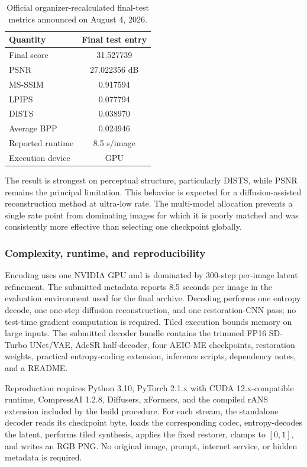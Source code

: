 \documentclass[10pt,twocolumn,letterpaper]{article}
\begin{document}
\begin{table}[h]
\centering\small
\begin{tabular}{@{}lc@{}}
\toprule
Quantity & Final test entry \\
\midrule
Final score & 31.527739 \\
PSNR & 27.022356 dB \\
MS-SSIM & 0.917594 \\
LPIPS & 0.077794 \\
DISTS & 0.038970 \\
Average BPP & 0.024946 \\
Reported runtime & 8.5 s/image \\
Execution device & GPU \\
\bottomrule
\end{tabular}
\caption{Official organizer-recalculated final-test metrics announced on August 4, 2026.}
\label{tab:results}
\end{table}

The result is strongest on perceptual structure, particularly DISTS, while PSNR remains the principal limitation. This behavior is expected for a diffusion-assisted reconstruction method at ultra-low rate. The multi-model allocation prevents a single rate point from dominating images for which it is poorly matched and was consistently more effective than selecting one checkpoint globally.

\subsubsection{Complexity, runtime, and reproducibility}
Encoding uses one NVIDIA GPU and is dominated by 300-step per-image latent refinement. The submitted metadata reports 8.5 seconds per image in the evaluation environment used for the final archive. Decoding performs one entropy decode, one one-step diffusion reconstruction, and one restoration-CNN pass; no test-time gradient computation is required. Tiled execution bounds memory on large inputs. The submitted decoder bundle contains the trimmed FP16 SD-Turbo UNet/VAE, AdcSR half-decoder, four AEIC-ME checkpoints, restoration weights, practical entropy-coding extension, inference scripts, dependency notes, and a README.

Reproduction requires Python 3.10, PyTorch 2.1.x with CUDA 12.x-compatible runtime, CompressAI 1.2.8, Diffusers, xFormers, and the compiled rANS extension included by the build procedure. For each stream, the standalone decoder reads its checkpoint byte, loads the corresponding codec, entropy-decodes the latent, performs tiled synthesis, applies the fixed restorer, clamps to $[0,1]$, and writes an RGB PNG. No original image, prompt, internet service, or hidden metadata is required.
\end{document}
